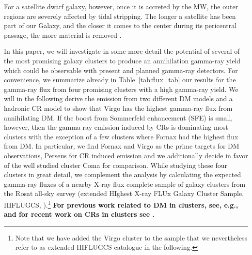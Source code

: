 \documentclass[10pt,aps,pra,reprint,amsmath,amsfonts,amssymb,showpacs,nofootinbib,floatfix]{revtex4-1}
\def\C#1{{\bf #1}}
\begin{document}
For a satellite dwarf galaxy, however, once it is accreted by the MW,
the outer regions are severely affected by tidal stripping. The longer
a satellite has been part of our Galaxy, and the closer it comes to
the center during its pericentral passage, the more material is
removed \cite{2004MNRAS.355..819G}.

In this paper, we will investigate in some more detail the potential
of several of the most promising galaxy clusters to produce an
annihilation gamma-ray yield which could be observable with present
and planned gamma-ray detectors. For convenience, we summarize already
in Table~\ref{tab:flux_tab} our results for the gamma-ray flux from
four promising clusters with a high gamma-ray yield. We will in the
following derive the emission from two different DM models and a
hadronic CR model to show that Virgo has the highest gamma-ray flux
from annihilating DM. If the boost from Sommerfeld enhancement (SFE)
is small, however, then the gamma-ray emission induced by CRs is
dominating most clusters with the exception of a few clusters where
Fornax had the highest flux from DM. In particular, we find Fornax and
Virgo as the prime targets for DM observations, Perseus for CR induced
emission and we additionally decide in favor of the well studied
cluster Coma for comparison. While studying these four clusters in
great detail, we complement the analysis by calculating the expected
gamma-ray fluxes of a nearby X-ray flux complete sample of galaxy
clusters from the Rosat all-sky survey (extended HIghest X-ray FLUx
Galaxy Cluster Sample, HIFLUGCS,
\citealt{2002ApJ...567..716R}).\footnote{Note that we have added the
  Virgo cluster to the sample that we nevertheless refer to as
  extended HIFLUGCS catalogue in the following.}  \C{For previous work
  related to DM in clusters, see, e.g.,
  \cite{2006A&A...455...21C,2009PhRvD..80b3005J,2011arXiv1104.3530S,2011ApJ...726L...6C,2010JCAP...05..025A}
  and for recent work on CRs in clusters see
  \cite{2010MNRAS.409..449P,2011MNRAS.410..127B,2008MNRAS.385.1211P,2009JCAP...08..002K,2010MNRAS.407.1565D}.}
\end{document}
